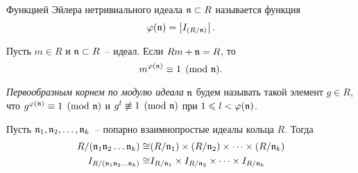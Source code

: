 \documentclass[_00_autoref.tex]{subfiles}
\begin{document}
\begin{definition}
    Функцией Эйлера нетривиального идеала $\mathfrak{n} \subset R$ называется функция
    \begin{equation*}
        \varphi(\mathfrak{n}) = \left|
            I_{(R/\mathfrak{n})}
        \right|.
    \end{equation*}
\end{definition}

\begin{statement}\cite{source:Petukhova}\label{statement:euler_function}
    Пусть $m \in R$ и $\mathfrak{n} \subset R$~-- идеал.
    Если $Rm + \mathfrak{n} = R$, то
    \begin{equation*}
        m^{\varphi(\mathfrak{n})}\equiv 1 \pmod{\mathfrak{n}}.
    \end{equation*}
\end{statement}

\begin{definition}
    \emph{Первообразным корнем по модулю идеала} $\mathfrak{n}$ будем называть такой элемент $g \in R$, что $g^{\varphi (\mathfrak{n})} \equiv 1 \pmod{\mathfrak{n}}$ и $g^{l} \not\equiv 1 \pmod{\mathfrak{n}}$ при $1 \leqslant l < \varphi(\mathfrak{n})$.
\end{definition}

\begin{statement}\label{statement:chinese_remainder_theorem}
    Пусть $\mathfrak{n}_1, \mathfrak{n}_2, \dots, \mathfrak{n}_k$~-- попарно взаимнопростые идеалы кольца $R$.
    Тогда
    \begin{equation*}
        \begin{split}
            R/(\mathfrak{n}_1\mathfrak{n}_2\dots\mathfrak{n}_k) \cong & (R/\mathfrak{n}_1) \times (R/\mathfrak{n}_2) \times \dots \times (R/\mathfrak{n}_k)\\
            I_{R/(\mathfrak{n}_1\mathfrak{n}_2\dots\mathfrak{n}_k)} \cong & I_{R/\mathfrak{n}_1} \times I_{R/\mathfrak{n}_2} \times \dots \times I_{R/\mathfrak{n}_k}
        \end{split}
    \end{equation*}
\end{statement}
\end{document}
